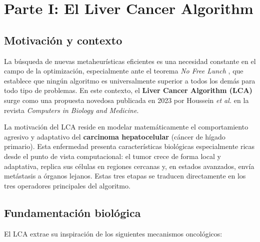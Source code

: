 
\section{Parte I: El Liver Cancer Algorithm}
\label{sec:parte1}

\subsection{Motivación y contexto}

La búsqueda de nuevas metaheurísticas eficientes es una necesidad constante en el campo de
la optimización, especialmente ante el teorema \emph{No Free Lunch} \cite{wolpert1997nfl},
que establece que ningún algoritmo es universalmente superior a todos los demás para todo
tipo de problemas. En este contexto, el \textbf{Liver Cancer Algorithm (LCA)} surge como
una propuesta novedosa publicada en 2023 por Houssein \emph{et al.} \cite{houssein2023lca}
en la revista \emph{Computers in Biology and Medicine}.

La motivación del LCA reside en modelar matemáticamente el comportamiento agresivo y
adaptativo del \textbf{carcinoma hepatocelular} (cáncer de hígado primario). Esta enfermedad
presenta características biológicas especialmente ricas desde el punto de vista computacional:
el tumor crece de forma local y adaptativa, replica sus células en regiones cercanas y,
en estados avanzados, envía metástasis a órganos lejanos. Estas tres etapas se traducen
directamente en los tres operadores principales del algoritmo.

\subsection{Fundamentación biológica}

El LCA extrae su inspiración de los siguientes mecanismos oncológicos:

